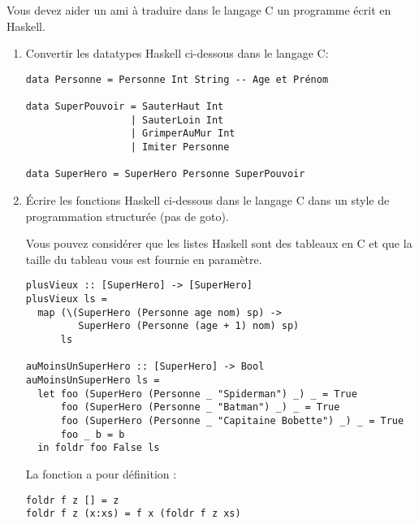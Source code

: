 \begin{Exercise}
  Vous devez aider un ami à traduire dans le langage C un programme
  écrit en Haskell.

\begin{enumerate}
\item
Convertir les datatypes Haskell ci-dessous dans le langage C:
\begin{verbatim}
data Personne = Personne Int String -- Age et Prénom

data SuperPouvoir = SauterHaut Int
                  | SauterLoin Int
                  | GrimperAuMur Int
                  | Imiter Personne

data SuperHero = SuperHero Personne SuperPouvoir

\end{verbatim}

\item
Écrire les fonctions Haskell ci-dessous dans le langage C dans un style
de programmation structurée (pas de goto).

Vous pouvez considérer que les listes Haskell sont des tableaux en C
et que la taille du tableau vous est fournie en paramètre.
\begin{verbatim}
plusVieux :: [SuperHero] -> [SuperHero]
plusVieux ls = 
  map (\(SuperHero (Personne age nom) sp) ->
         SuperHero (Personne (age + 1) nom) sp)
      ls

auMoinsUnSuperHero :: [SuperHero] -> Bool
auMoinsUnSuperHero ls =
  let foo (SuperHero (Personne _ "Spiderman") _) _ = True
      foo (SuperHero (Personne _ "Batman") _) _ = True
      foo (SuperHero (Personne _ "Capitaine Bobette") _) _ = True
      foo _ b = b
  in foldr foo False ls
\end{verbatim}

La fonction  a pour définition :
\begin{verbatim}
foldr f z [] = z 
foldr f z (x:xs) = f x (foldr f z xs) 
\end{verbatim}
\end{enumerate}
\end{Exercise}